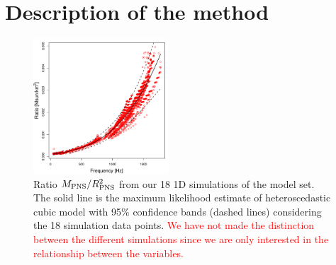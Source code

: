 \section{Description of the method}
\label{methods}

\begin{figure}[t]
 \centering
 \includegraphics[width=0.45\textwidth]{plots/model}
 \caption{Ratio $M_{\rm PNS}/R_{\rm PNS}^2$ from our 18 1D simulations of the model set. The solid line is the maximum likelihood estimate of heteroscedastic cubic model with 95\% confidence bands (dashed lines) considering the 18 simulation data points. \textcolor{red}{We have not made the distinction between the different simulations since we are only interested in the relationship between the variables.} }
 \label{fig:LMVAR}
\end{figure}

